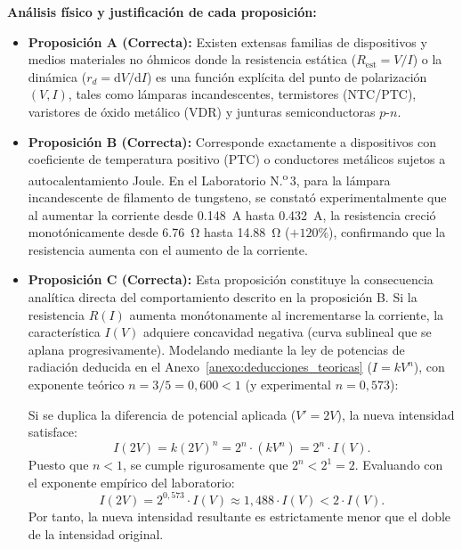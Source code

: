 \begin{appendices}
\textbf{Análisis físico y justificación de cada proposición:}
\begin{itemize}
    \item \textbf{Proposición A (Correcta):} Existen extensas familias de dispositivos y medios materiales no óhmicos donde la resistencia estática ($R_{\text{est}} = V/I$) o la dinámica ($r_d = \mathrm{d}V/\mathrm{d}I$) es una función explícita del punto de polarización $(V, I)$, tales como lámparas incandescentes, termistores (NTC/PTC), varistores de óxido metálico (VDR) y junturas semiconductoras $p$-$n$.
    
    \item \textbf{Proposición B (Correcta):} Corresponde exactamente a dispositivos con coeficiente de temperatura positivo (PTC) o conductores metálicos sujetos a autocalentamiento Joule. En el Laboratorio N.\textsuperscript{o}\,3, para la lámpara incandescente de filamento de tungsteno, se constató experimentalmente que al aumentar la corriente desde \qty{0,148}{\ampere} hasta \qty{0,432}{\ampere}, la resistencia creció monotónicamente desde \qty{6,76}{\ohm} hasta \qty{14,88}{\ohm} ($+120\%$), confirmando que la resistencia aumenta con el aumento de la corriente.
    
    \item \textbf{Proposición C (Correcta):} Esta proposición constituye la consecuencia analítica directa del comportamiento descrito en la proposición B. Si la resistencia $R(I)$ aumenta monótonamente al incrementarse la corriente, la característica $I(V)$ adquiere concavidad negativa (curva sublineal que se aplana progresivamente). Modelando mediante la ley de potencias de radiación deducida en el Anexo~\ref{anexo:deducciones_teoricas} ($I = k V^n$), con exponente teórico $n = 3/5 = 0{,}600 < 1$ (y experimental $n = 0{,}573$):
    
    Si se duplica la diferencia de potencial aplicada ($V' = 2V$), la nueva intensidad satisface:
    \begin{equation}
        I(2V) = k (2V)^n = 2^n \cdot \left( k V^n \right) = 2^n \cdot I(V).
    \end{equation}
    Puesto que $n < 1$, se cumple rigurosamente que $2^n < 2^1 = 2$. Evaluando con el exponente empírico del laboratorio:
    \begin{equation}
        I(2V) = 2^{0{,}573} \cdot I(V) \approx 1{,}488 \cdot I(V) < 2 \cdot I(V).
    \end{equation}
    Por tanto, la nueva intensidad resultante es estrictamente menor que el doble de la intensidad original.
    

\end{itemize}
\end{appendices}
